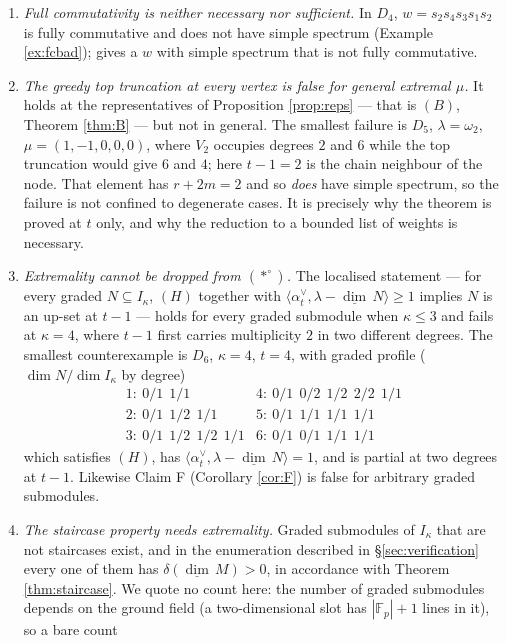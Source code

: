 \documentclass[reqno]{amsart}
\theoremstyle{plain}
\theoremstyle{definition}
\newcommand{\dimv}{\underline{\dim}\,}
\newcommand{\la}{\lambda}
\newcommand{\al}{\alpha}
\newcommand{\om}{\omega}
\newcommand{\ka}{\kappa}
\begin{document}
\begin{enumerate}
\item[\textbf{(N1)}] \emph{Full commutativity is neither necessary nor
sufficient.}  In $D_4$, $w=s_2s_4s_3s_1s_2$ is fully commutative and does not
have simple spectrum (Example \ref{ex:fcbad}); \cite[Ex.~5.12]{DKK} gives a $w$
with simple spectrum that is not fully commutative.
\item[\textbf{(N2)}] \emph{The greedy top truncation at every vertex is false
for general extremal $\mu$.}  It holds at the representatives of Proposition
\ref{prop:reps} --- that is $(B)$, Theorem \ref{thm:B} --- but not in general.
The smallest failure is $D_5$, $\la=\om_2$, $\mu=(1,-1,0,0,0)$, where $V_2$
occupies degrees $2$ and $6$ while the top truncation would give $6$ and $4$;
here $t-1=2$ is the chain neighbour of the node.  That element has $r+2m=2$ and
so \emph{does} have simple spectrum, so the failure is not confined to
degenerate cases.  It is precisely why the theorem is proved at $t$ only, and
why the reduction to a bounded list of weights is necessary.
\item[\textbf{(N3)}] \emph{Extremality cannot be dropped from $(*^\circ)$.}  The
localised statement --- for every graded $N\subseteq I_\ka$, $(H)$ together with
$\langle\al_t^\vee,\la-\dimv N\rangle\ge1$ implies $N$ is an up-set at $t-1$ ---
holds for every graded submodule when $\ka\le3$ and fails at $\ka=4$, where
$t-1$ first carries multiplicity $2$ in two different degrees.  The smallest
counterexample is $D_6$, $\ka=4$, $t=4$, with graded profile
($\dim N/\dim I_\ka$ by degree)
\[
\begin{array}{ll}
 1:\ 0/1\ \ 1/1 &
 4:\ 0/1\ \ 0/2\ \ 1/2\ \ 2/2\ \ 1/1\\
 2:\ 0/1\ \ 1/2\ \ 1/1 &
 5:\ 0/1\ \ 1/1\ \ 1/1\ \ 1/1\\
 3:\ 0/1\ \ 1/2\ \ 1/2\ \ 1/1 &
 6:\ 0/1\ \ 0/1\ \ 1/1\ \ 1/1
\end{array}
\]
which satisfies $(H)$, has $\langle\al_t^\vee,\la-\dimv N\rangle=1$, and is
partial at two degrees at $t-1$.  Likewise Claim F (Corollary \ref{cor:F}) is
false for arbitrary graded submodules.
\item[\textbf{(N4)}] \emph{The staircase property needs extremality.}  Graded
submodules of $I_\ka$ that are not staircases exist, and in the enumeration
described in \S\ref{sec:verification} every one of them has
$\delta(\dimv M)>0$, in accordance with Theorem \ref{thm:staircase}.  We quote
no count here: the number of graded submodules depends on the ground field
(a two-dimensional slot has $|\mathbb{F}_p|+1$ lines in it), so a bare count

\end{enumerate}
\end{document}
